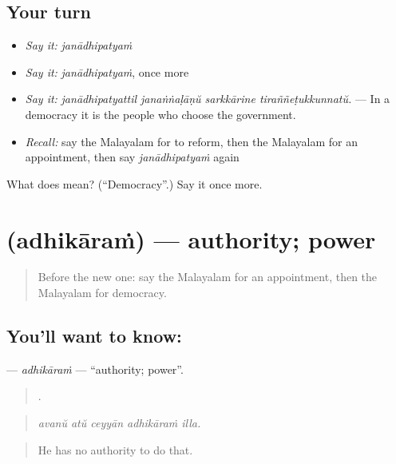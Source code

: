 \subsection*{Your turn}
\begin{itemize}
\raggedright
  \item \emph{Say it:} \emph{janādhipatyaṁ}
  \item \emph{Say it:} \emph{janādhipatyaṁ}, once more
  \item \emph{Say it:} \emph{janādhipatyattil janaṅṅaḷāṇŭ sarkkārine tiraññeṭukkunnatŭ.} — In a democracy it is the people who choose the government.
  \item \emph{Recall:} say the Malayalam for to reform, then the Malayalam for an appointment, then say \emph{janādhipatyaṁ} again
\end{itemize}

\begin{tcolorbox}[breakable,colback=teal!4,colframe=teal!35!black,title={Before you move on}]
What does  mean? (\textquotedblleft{}Democracy\textquotedblright{}.) Say it once more.
\end{tcolorbox}
\section[\texorpdfstring{\ml{അധികാരം} (adhikāraṁ)}{അധികാരം (adhikāraṁ)}]{ (adhikāraṁ) — authority; power}

\label{lesson:ML-C424-adhikaram}



\begin{quote}
Before the new one: say the Malayalam for an appointment, then the Malayalam for democracy.
\end{quote}

\subsection*{You'll want to know: }
\textbf{} — \emph{adhikāraṁ} — \textquotedblleft{}authority; power\textquotedblright{}.

\begin{quote}
    .
\end{quote}

\begin{quote}
\emph{avanŭ atŭ ceyyān adhikāraṁ illa.}
\end{quote}

\begin{quote}
He has no authority to do that.
\end{quote}

